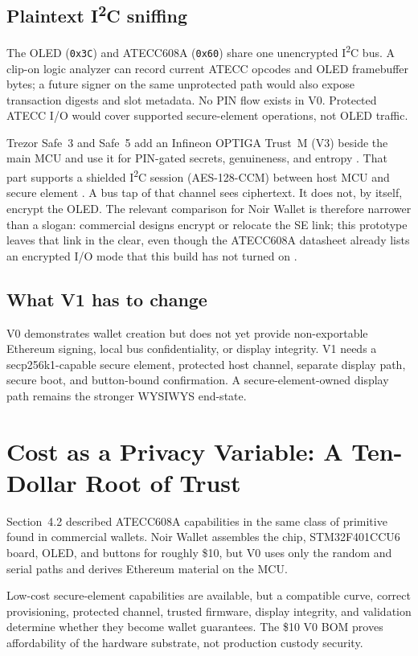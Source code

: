 \documentclass[10pt]{article}
\begin{document}
\subsection{Plaintext I\textsuperscript{2}C sniffing}
The OLED (\texttt{0x3C}) and ATECC608A (\texttt{0x60}) share one unencrypted I\textsuperscript{2}C bus. A clip-on logic analyzer can record current ATECC opcodes and OLED framebuffer bytes; a future signer on the same unprotected path would also expose transaction digests and slot metadata. No PIN flow exists in V0. Protected ATECC I/O would cover supported secure-element operations, not OLED traffic.

Trezor Safe~3 and Safe~5 add an Infineon OPTIGA Trust~M (V3) beside the main MCU and use it for PIN-gated secrets, genuineness, and entropy \cite{trezor-se}. That part supports a shielded I\textsuperscript{2}C session (AES-128-CCM) between host MCU and secure element \cite{optiga-shield}. A bus tap of that channel sees ciphertext. It does not, by itself, encrypt the OLED. The relevant comparison for Noir Wallet is therefore narrower than a slogan: commercial designs encrypt or relocate the SE link; this prototype leaves that link in the clear, even though the ATECC608A datasheet already lists an encrypted I/O mode that this build has not turned on \cite{atecc608a2019}.

\subsection{What V1 has to change}
V0 demonstrates wallet creation but does not yet provide non-exportable Ethereum signing, local bus confidentiality, or display integrity. V1 needs a secp256k1-capable secure element, protected host channel, separate display path, secure boot, and button-bound confirmation. A secure-element-owned display path remains the stronger WYSIWYS end-state.

\section{Cost as a Privacy Variable: A Ten-Dollar Root of Trust}

Section~4.2 described ATECC608A capabilities in the same class of primitive found in commercial wallets. Noir Wallet assembles the chip, STM32F401CCU6 board, OLED, and buttons for roughly \$10, but V0 uses only the random and serial paths and derives Ethereum material on the MCU.

Low-cost secure-element capabilities are available, but a compatible curve, correct provisioning, protected channel, trusted firmware, display integrity, and validation determine whether they become wallet guarantees. The \$10 V0 BOM proves affordability of the hardware substrate, not production custody security.
\end{document}
